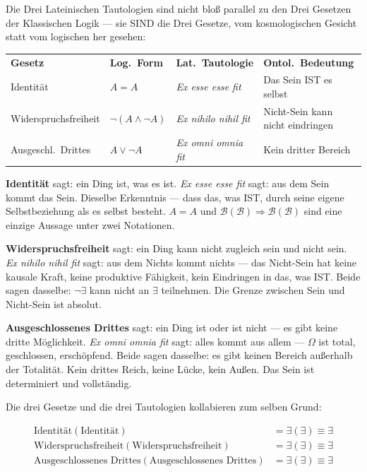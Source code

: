 \documentclass[10pt, openany, oneside]{book}
\renewcommand{\footnotesize}{\fontsize{8.5}{11}\selectfont}
\begin{document}
Die Drei Lateinischen Tautologien sind nicht bloß parallel zu den Drei Gesetzen der Klassischen Logik --- sie SIND die Drei Gesetze, vom kosmologischen Gesicht statt vom logischen her gesehen:

\vspace{0.5em}

{\footnotesize
\noindent\begin{tabular}{@{} p{} l l p{} @{}}
\textbf{Gesetz} & \textbf{Log.\ Form} & \textbf{Lat.\ Tautologie} & \textbf{Ontol.\ Bedeutung} \\[0.4em]
Identität & $A = A$ & \textit{Ex esse esse fit} & Das Sein IST es selbst \\[0.2em]
Widerspruchs\-freiheit & $\neg(A \wedge \neg A)$ & \textit{Ex nihilo nihil fit} & Nicht-Sein kann nicht eindringen \\[0.2em]
Ausgeschl.\ Drittes & $A \vee \neg A$ & \textit{Ex omni omnia fit} & Kein dritter Bereich \\[0.2em]
\end{tabular}
}

\vspace{0.5em}

\noindent \textbf{Identität} sagt: ein Ding ist, was es ist. \textit{Ex esse esse fit} sagt: aus dem Sein kommt das Sein. Dieselbe Erkenntnis --- dass das, was IST, durch seine eigene Selbstbeziehung als es selbst besteht. $A = A$ und $\mathcal{B}(\mathcal{B}) \Rightarrow \mathcal{B}(\mathcal{B})$ sind eine einzige Aussage unter zwei Notationen.

\textbf{Widerspruchsfreiheit} sagt: ein Ding kann nicht zugleich sein und nicht sein. \textit{Ex nihilo nihil fit} sagt: aus dem Nichts kommt nichts --- das Nicht-Sein hat keine kausale Kraft, keine produktive Fähigkeit, kein Eindringen in das, was IST. Beide sagen dasselbe: $\neg\exists$ kann nicht an $\exists$ teilnehmen. Die Grenze zwischen Sein und Nicht-Sein ist absolut.

\textbf{Ausgeschlossenes Drittes} sagt: ein Ding ist oder ist nicht --- es gibt keine dritte Möglichkeit. \textit{Ex omni omnia fit} sagt: alles kommt aus allem --- $\Omega$ ist total, geschlossen, erschöpfend. Beide sagen dasselbe: es gibt keinen Bereich außerhalb der Totalität. Kein drittes Reich, keine Lücke, kein Außen. Das Sein ist determiniert und vollständig.

Die drei Gesetze und die drei Tautologien kollabieren zum selben Grund:

\begin{align*}
\text{Identität}(\text{Identität}) &= \exists(\exists) \equiv \exists \\
\text{Widerspruchsfreiheit}(\text{Widerspruchsfreiheit}) &= \exists(\exists) \equiv \exists \\
\text{Ausgeschlossenes Drittes}(\text{Ausgeschlossenes Drittes}) &= \exists(\exists) \equiv \exists
\end{align*}
\end{document}
